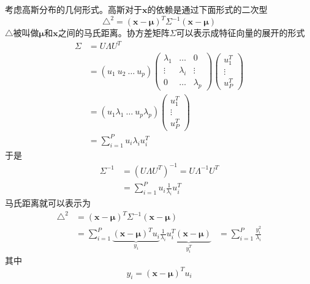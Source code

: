 考虑高斯分布的几何形式。高斯对于$\boldsymbol{x}$的依赖是通过下面形式的二次型
\begin{equation}
	\triangle^2=(\boldsymbol{x}-\boldsymbol{\mu})^T\Sigma^{-1}(\boldsymbol{x}-\boldsymbol{\mu})
\end{equation}
$\triangle$被叫做$\boldsymbol{\mu}$和$\boldsymbol{x}$之间的马氏距离。协方差矩阵$\Sigma$可以表示成特征向量的展开的形式
\begin{equation}
	\begin{aligned}
	\Sigma&=U\Lambda U^T\\
	&=(u_1\ u_2\ \dots \ u_p)
	\begin{pmatrix}
		\lambda_1& \dots    & 0 \\
		\vdots   & \lambda_i&\vdots\\
		0        & \dots    &\lambda_p
	\end{pmatrix}
	\begin{pmatrix}
		u_1^T\\\vdots\\u_P^T
	\end{pmatrix}\\
	&=(u_1\lambda_1\ \dots \ u_p\lambda_p)
	\begin{pmatrix}
		u_1^T\\\vdots\\u_P^T
	\end{pmatrix}\\
	&=\sum_{i=1}^{P}u_i\lambda_i u_i^T
	\end{aligned}
\end{equation}
于是
\begin{equation}
\begin{aligned}
	\Sigma^{-1}&=(U\Lambda U^T)^{-1}=U\Lambda^{-1}U^T\\
	&=\sum_{i=1}^{P}u_i\frac{1}{\lambda_i}u_i^T
\end{aligned}
\end{equation}
马氏距离就可以表示为
\begin{equation}
	\begin{aligned}
		\triangle^2&=(\boldsymbol{x}-\boldsymbol{\mu})^T\Sigma^{-1}(\boldsymbol{x}-\boldsymbol{\mu})\\
		&=\sum_{i=1}^{P}\underbrace{(\boldsymbol{x}-\boldsymbol{\mu})^Tu_i}_{y_i}\frac{1}{\lambda_i}\underbrace{u_i^T(\boldsymbol{x}-\boldsymbol{\mu})}_{y_i^T}
		&=\sum_{i=1}^{P}\frac{y_i^2}{\lambda_i}
	\end{aligned}
\end{equation}
其中
\begin{equation}
	y_i=(\boldsymbol{x}-\boldsymbol{\mu})^Tu_i
\end{equation}
